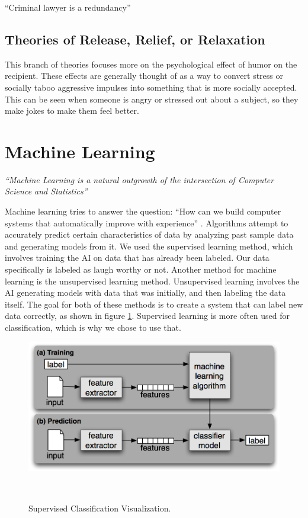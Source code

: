 ``Criminal lawyer is a redundancy'' \cite{oneliners}

\subsection{Theories of Release, Relief, or Relaxation}
This branch of theories focuses more on the psychological effect of humor on the recipient. These effects are generally thought of as a way to convert stress or socially taboo aggressive impulses into something that is more socially accepted. This can be seen when someone is angry or stressed out about a subject, so they make jokes to make them feel better.


\section{Machine Learning}
\textit{``Machine Learning is a natural outgrowth of the intersection of Computer Science and Statistics''} \cite{machine_learning}

Machine learning tries to answer the question: ``How can we build computer systems that automatically improve with experience'' \cite{machine_learning}. Algorithms attempt to accurately predict certain characteristics of data by analyzing past sample data and generating models from it. We used the supervised learning method, which involves training the AI on data that has already been labeled. Our data specifically is labeled as laugh worthy or not. Another method for machine learning is the unsupervised learning method. Unsupervised learning involves the AI generating models with data that was initially, and then labeling the data itself. The goal for both of these methods is to create a system that can label new data correctly, as shown in figure \ref{fig:machinelearning}. Supervised learning is more often used for classification, which is why we chose to use that. \cite{machine_learning}

\begin{figure}
\centering
\includegraphics{figures/supervised-classification}
  \caption{Supervised Classification Visualization.\cite{NLTK}}~\label{fig:machinelearning}
\end{figure}


